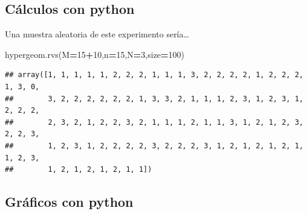 \documentclass[]{book}
\newenvironment{Shaded}{\begin{snugshade}}{\end{snugshade}}
\newcommand{\DecValTok}[1]{\textcolor[rgb]{0.00,0.00,0.81}{#1}}
\newcommand{\NormalTok}[1]{#1}
\newcommand{\OperatorTok}[1]{\textcolor[rgb]{0.81,0.36,0.00}{\textbf{#1}}}
\begin{document}
\hypertarget{cuxe1lculos-con-python-13}{%
\subsection{Cálculos con python}\label{cuxe1lculos-con-python-13}}

Una muestra aleatoria de este experimento sería\ldots{}

\begin{Shaded}
\begin{Highlighting}[]
\NormalTok{hypergeom.rvs(M}\OperatorTok{=}\DecValTok{15}\OperatorTok{+}\DecValTok{10}\NormalTok{,n}\OperatorTok{=}\DecValTok{15}\NormalTok{,N}\OperatorTok{=}\DecValTok{3}\NormalTok{,size}\OperatorTok{=}\DecValTok{100}\NormalTok{)}
\end{Highlighting}
\end{Shaded}

\begin{verbatim}
## array([1, 1, 1, 1, 1, 2, 2, 2, 1, 1, 1, 3, 2, 2, 2, 2, 1, 2, 2, 2, 1, 3, 0,
##        3, 2, 2, 2, 2, 2, 2, 1, 3, 3, 2, 1, 1, 1, 2, 3, 1, 2, 3, 1, 2, 2, 2,
##        2, 3, 2, 1, 2, 2, 3, 2, 1, 1, 1, 2, 1, 1, 3, 1, 2, 1, 2, 3, 2, 2, 3,
##        1, 2, 3, 1, 2, 2, 2, 2, 3, 2, 2, 2, 3, 1, 2, 1, 2, 1, 2, 1, 1, 2, 3,
##        1, 2, 1, 2, 1, 2, 1, 1])
\end{verbatim}

\hypertarget{gruxe1ficos-con-python-4}{%
\subsection{Gráficos con python}\label{gruxe1ficos-con-python-4}}
\end{document}
